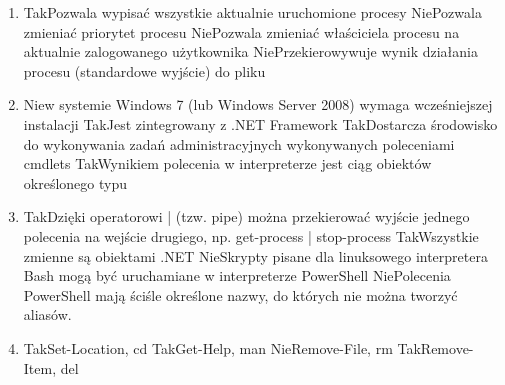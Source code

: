 \begin{enumerate}
		\newpage
		\item {}%
		{Tak}{Pozwala wypisać wszystkie aktualnie uruchomione procesy}%
		{Nie}{Pozwala zmieniać priorytet procesu}%
		{Nie}{Pozwala zmieniać właściciela procesu na aktualnie zalogowanego użytkownika}%
		{Nie}{Przekierowywuje wynik działania procesu (standardowe wyjście) do pliku}
		\item {}%
		{Nie}{w systemie Windows 7 (lub Windows Server 2008) wymaga wcześniejszej instalacji}%
		{Tak}{Jest zintegrowany z .NET Framework}%
		{Tak}{Dostarcza środowisko do wykonywania zadań administracyjnych wykonywanych poleceniami cmdlets}%
		{Tak}{Wynikiem polecenia w interpreterze jest ciąg obiektów określonego typu}
		\item {}%
		{Tak}{Dzięki operatorowi | (tzw. pipe) można przekierować wyjście jednego polecenia na wejście drugiego, np. get-process | stop-process}%
		{Tak}{Wszystkie zmienne są obiektami .NET}%
		{Nie}{Skrypty pisane dla linuksowego interpretera Bash mogą być uruchamiane w interpreterze PowerShell}%
		{Nie}{Polecenia PowerShell mają ściśle określone nazwy, do których nie można tworzyć aliasów.}
		\item {}%
		{Tak}{Set-Location, cd}%
		{Tak}{Get-Help, man}%
		{Nie}{Remove-File, rm}%
		{Tak}{Remove-Item, del}
		

\end{enumerate}
